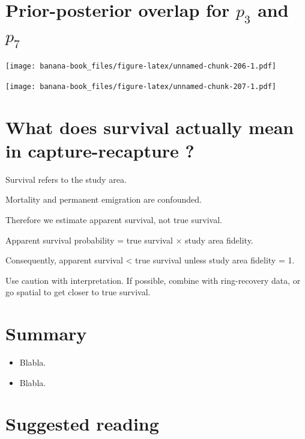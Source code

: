 \documentclass[
  12pt,
]{krantz}
\begin{document}
\hypertarget{prior-posterior-overlap-for-p_3-and-p_7}{%
\section{\texorpdfstring{Prior-posterior overlap for \(p_3\) and \(p_7\)}{Prior-posterior overlap for p\_3 and p\_7}}\label{prior-posterior-overlap-for-p_3-and-p_7}}

\texttt{[image: banana-book\_files/figure-latex/unnamed-chunk-206-1.pdf]}

\texttt{[image: banana-book\_files/figure-latex/unnamed-chunk-207-1.pdf]}

\hypertarget{what-does-survival-actually-mean-in-capture-recapture}{%
\section{What does survival actually mean in capture-recapture ?}\label{what-does-survival-actually-mean-in-capture-recapture}}

Survival refers to the study area.

Mortality and permanent emigration are confounded.

Therefore we estimate apparent survival, not true survival.

Apparent survival probability = true survival × study area fidelity.

Consequently, apparent survival \textless{} true survival unless study area fidelity = 1.

Use caution with interpretation. If possible, combine with ring-recovery data, or go spatial to get closer to true survival.

\hypertarget{summary-3}{%
\section{Summary}\label{summary-3}}

\begin{itemize}
\item
  Blabla.
\item
  Blabla.
\end{itemize}

\hypertarget{suggested-reading-3}{%
\section{Suggested reading}\label{suggested-reading-3}}
\end{document}
